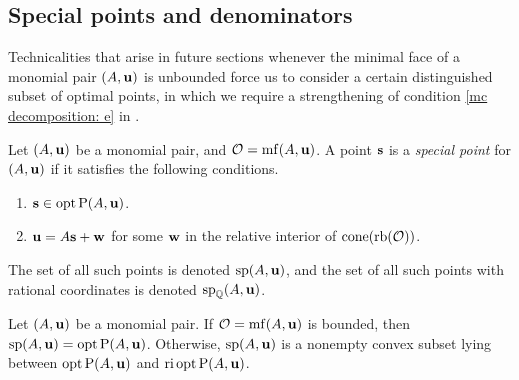\documentclass[11pt]{amsart}
\begin{document}
\subsection{Special points and denominators}

Technicalities that arise in future sections whenever the minimal face of a monomial pair $(A, \mathbf{u})$ is unbounded force us to consider a certain distinguished subset of optimal points, in which we require a strengthening of condition \eqref{mc decomposition: e} in .

\begin{definition}
\label{mc: D}
Let $(A,\mathbf{u})$ be a monomial pair, and $\mathcal{O} = \operatorname{mf}(A, \mathbf{u})$.  A point $\mathbf{s}$ is a \emph{special point} for $(A, \mathbf{u})$ if it satisfies the following conditions.
\begin{enumerate}
\item $\mathbf{s} \in \operatorname{opt} \mathrm{P}(A, \mathbf{u})$.
\item $\mathbf{u} = A \mathbf{s} + \mathbf{w}$ for some $\mathbf{w}$ in the relative interior of $\operatorname{cone} ( \operatorname{rb}(\mathcal{O}))$.
\end{enumerate}
The set of all such points is denoted $\operatorname{sp}(A, \mathbf{u})$, and the set of all such points with rational coordinates is denoted $\operatorname{sp}_{\mathbb{Q}}(A, \mathbf{u})$.
\end{definition}

\begin{proposition}
   \label{opt versus mc: P}
   Let $(A,\mathbf{u})$ be a monomial pair.
   If $\mathcal{O} = \operatorname{mf}(A, \mathbf{u})$ is bounded, then $\operatorname{sp}(A, \mathbf{u}) = \operatorname{opt} \mathrm{P}(A, \mathbf{u})$.  Otherwise,  $\operatorname{sp}(A, \mathbf{u})$ is a nonempty convex subset lying between $\operatorname{opt} \mathrm{P}(A, \mathbf{u})$ and $\operatorname{ri} \operatorname{opt} \mathrm{P}(A, \mathbf{u})$.
\end{proposition}
\end{document}

